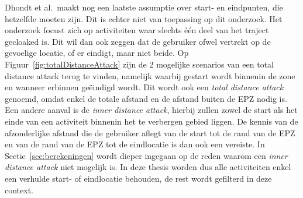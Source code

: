 Dhondt et al.\ maakt nog een laatste assumptie over start- en eindpunten, die
hetzelfde moeten zijn. Dit is echter niet van toepassing op dit onderzoek. Het
onderzoek focust zich op activiteiten waar slechts één deel van het traject
gecloaked is. Dit wil dan ook zeggen dat de gebruiker ofwel vertrekt op de
gevoelige locatie, of er eindigt, maar niet beide. Op
Figuur~\ref{fig:totalDistanceAttack} zijn de 2 mogelijke scenarios van een
total distance attack terug te vinden, namelijk waarbij gestart wordt binnenin
de zone en wanneer erbinnen geëindigd wordt. Dit wordt ook een \textit{total
    distance attack} genoemd, omdat enkel de totale afstand en de afstand buiten de
\ac{EPZ} nodig is. Een andere aanval is de \textit{inner distance attack},
hierbij zullen zowel de start als het einde van een activiteit binnenin het te
verbergen gebied liggen. De kennis van de afzonderlijke afstand die de
gebruiker aflegt van de start tot de rand van de \ac{EPZ} en van de rand van de
\ac{EPZ} tot de eindlocatie is dan ook een vereiste. In
Sectie~\ref{sec:berekeningen} wordt dieper ingegaan op de reden waarom een
\textit{inner distance attack} niet mogelijk is. In deze thesis worden dus alle
activiteiten enkel een verhulde start- of eindlocatie behouden, de rest wordt
gefilterd in deze context.
